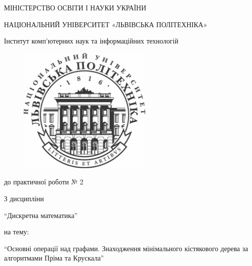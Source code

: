 \documentclass{article}
\begin{document}
\pagestyle{empty}
\begin{center}

	{\fontsize{14}{24}\selectfont МІНІСТЕРСТВО ОСВІТИ І НАУКИ УКРАЇНИ

	НАЦІОНАЛЬНИЙ УНІВЕРСИТЕТ «ЛЬВІВСЬКА ПОЛІТЕХНІКА»

	Інститут комп'ютерних наук та інформаційних технологій

	}

	\vspace{90.4pt} %
	\begin{figure}[h]
		\centering
		\includegraphics[width=6.5cm,keepaspectratio]{../../lpnu.png}
	\end{figure}

	{\fontsize{18}{29}\selectfont{Звіт}

	{до практичної роботи № 2}

	{З дисципліни}

	{``Дискретна математика''}

	{на тему:}

	{``Основні операції над графами. Знаходження  мінімального кістякового дерева
за алгоритмами Пріма та Крускала''}

	}
\end{center}
\end{document}
